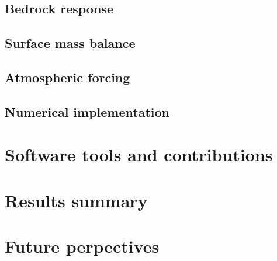 \documentclass{article}
\begin{document}
\subsection{Bedrock response}
\subsection{Surface mass balance}
\subsection{Atmospheric forcing}
\subsection{Numerical implementation}




\section{Software tools and contributions}


\section{Results summary}


\section{Future perpectives}

\newcommand{\urlprefix}[0]{}  %



\end{document}
